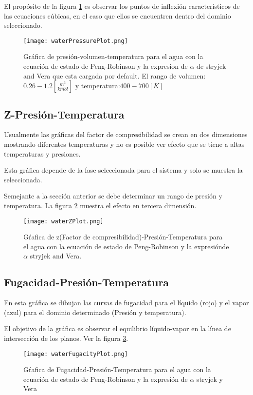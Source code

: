 		El propósito de la figura \ref{fig:press} es observar los puntos de inflexión característicos de las ecuaciones cúbicas, en el caso que ellos se encuentren dentro del dominio seleccionado.

		\begin{figure}[!h]
			\texttt{[image: waterPressurePlot.png]}
			\caption{Gráfica de presión-volumen-temperatura para el agua con la ecuación de estado de Peng-Robinson y la expresion de $\alpha$ de stryjek and Vera que esta cargada por default. El rango de volumen: $0.26-1.2 [\frac{m^3}{kmol}]$ y temperatura:$400-700[K]$ }
			\label{fig:press}
		\end{figure}
	\subsection{Z-Presión-Temperatura}\label{subsec:zpt}
		Usualmente las gráficas del factor de compresibilidad se crean en dos dimensiones mostrando diferentes temperaturas y no es posible ver efecto que se tiene a altas temperaturas y presiones.

		Esta gráfica depende de la fase seleccionada para el sistema y solo se muestra la seleccionada.

		Semejante a la sección anterior se debe determinar un rango de presión y temperatura. La figura \ref{fig:zplot} muestra el efecto en tercera dimensión.
		\begin{figure}[!h]
			\texttt{[image: waterZPlot.png]}
			\caption{Gŕafica de z(Factor de compresibilidad)-Presión-Temperatura para el agua con la ecuación de estado de Peng-Robinson y la expresiónde $\alpha$ stryjek and Vera.}
			\label{fig:zplot}
		\end{figure}
	\subsection{Fugacidad-Presión-Temperatura}\label{subsec:fpt}

		En esta gráfica se dibujan las curvas de fugacidad para el líquido (rojo) y el vapor (azul) para el dominio determinado (Presión y temperatura).

		El objetivo de la gráfica es observar el equilibrio líquido-vapor en la línea de intersección de los planos. Ver la figura \ref{fig:fugplot}.

		\begin{figure}[!h]
			\texttt{[image: waterFugacityPlot.png]}
			\caption{Gŕafica de Fugacidad-Presión-Temperatura para el agua con la ecuación de estado de Peng-Robinson y la expresión de $\alpha$ stryjek y Vera}
			\label{fig:fugplot}
		\end{figure}
